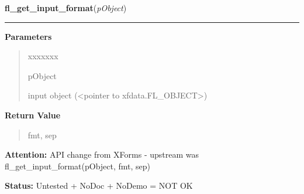 \hspace{.8\funcindent}\begin{boxedminipage}{\funcwidth}

    \raggedright \textbf{fl\_get\_input\_format}(\textit{pObject})

    \vspace{-1.5ex}

    \rule{\textwidth}{0.5\fboxrule}
\setlength{\parskip}{2ex}
\setlength{\parskip}{1ex}
      \textbf{Parameters}
      \vspace{-1ex}

      \begin{quote}
        \begin{Ventry}{xxxxxxx}

          \item[pObject]

          input object ({\textless}pointer to 
          xfdata.FL\_OBJECT{\textgreater})

        \end{Ventry}

      \end{quote}

      \textbf{Return Value}
    \vspace{-1ex}

      \begin{quote}
      fmt, sep

      \end{quote}

\textbf{Attention:} API change from XForms - upstream was fl\_get\_input\_format(pObject, fmt, 
sep)



\textbf{Status:} Untested + NoDoc + NoDemo = NOT OK



    \end{boxedminipage}

    \label{xformslib:library:fl_get_input}

    \vspace{0.5ex}

